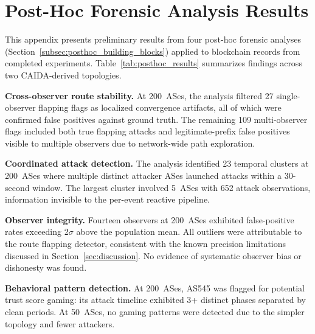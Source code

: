 \section{Post-Hoc Forensic Analysis Results}
\label{app:posthoc_results}

This appendix presents preliminary results from four post-hoc forensic analyses (Section~\ref{subsec:posthoc_building_blocks}) applied to blockchain records from completed experiments. Table~\ref{tab:posthoc_results} summarizes findings across two CAIDA-derived topologies.

 

\textbf{Cross-observer route stability.} At 200~ASes, the analysis filtered 27 single-observer flapping flags as localized convergence artifacts, all of which were confirmed false positives against ground truth. The remaining 109 multi-observer flags included both true flapping attacks and legitimate-prefix false positives visible to multiple observers due to network-wide path exploration.

\textbf{Coordinated attack detection.} The analysis identified 23 temporal clusters at 200~ASes where multiple distinct attacker ASes launched attacks within a 30-second window. The largest cluster involved 5~ASes with 652 attack observations, information invisible to the per-event reactive pipeline.

\textbf{Observer integrity.} Fourteen observers at 200~ASes exhibited false-positive rates exceeding 2$\sigma$ above the population mean. All outliers were attributable to the route flapping detector, consistent with the known precision limitations discussed in Section~\ref{sec:discussion}. No evidence of systematic observer bias or dishonesty was found.

\textbf{Behavioral pattern detection.} At 200~ASes, AS545 was flagged for potential trust score gaming: its attack timeline exhibited 3+ distinct phases separated by clean periods. At 50~ASes, no gaming patterns were detected due to the simpler topology and fewer attackers.
